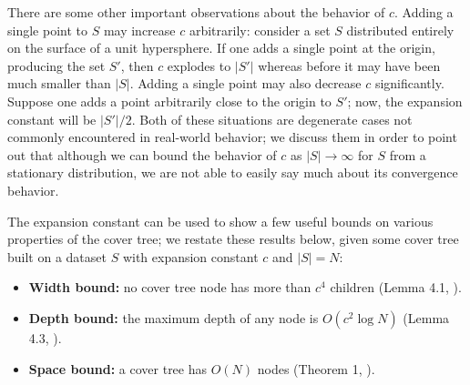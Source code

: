 
There are some other important observations about the behavior of $c$.  Adding a
single point to $S$ may increase $c$ arbitrarily: consider a set $S$ distributed
entirely on the surface of a unit hypersphere.  If one adds a single point at
the origin, producing the set $S'$, then $c$ explodes to $|S'|$ whereas before
it may have been much smaller than $|S|$.  Adding a single point may also
decrease $c$ significantly.  Suppose one adds a point arbitrarily close to the
origin to $S'$; now, the expansion constant will be $|S'| / 2$.  Both of these
situations are degenerate cases not commonly encountered in real-world behavior;
we discuss them in order to point out that although we can bound the behavior of
$c$ as $|S| \to \infty$ for $S$ from a stationary distribution, we are not able
to easily say much about its convergence behavior.

The expansion constant can be used to show a few useful bounds on various
properties of the cover tree; we restate these results below, given some cover
tree built on a dataset $S$ with expansion constant $c$ and $|S| = N$:

\begin{itemize}
  \item {\bf Width bound:} no cover tree node has more than $c^4$ children
(Lemma 4.1, \cite{langford2006}).

  \item {\bf Depth bound:} the maximum depth of any node is $O(c^2 \log N)$
(Lemma 4.3, \cite{langford2006}).

  \item {\bf Space bound:} a cover tree has $O(N)$ nodes (Theorem 1,
\cite{langford2006}).
\end{itemize}


